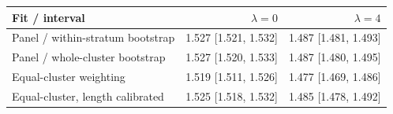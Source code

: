 \begin{tabular}{lrr}
\toprule
Fit / interval & $\lambda=0$ & $\lambda=4$ \\
\midrule
Panel / within-stratum bootstrap & 1.527 [1.521, 1.532] & 1.487 [1.481, 1.493] \\
Panel / whole-cluster bootstrap & 1.527 [1.520, 1.533] & 1.487 [1.480, 1.495] \\
Equal-cluster weighting & 1.519 [1.511, 1.526] & 1.477 [1.469, 1.486] \\
Equal-cluster, length calibrated & 1.525 [1.518, 1.532] & 1.485 [1.478, 1.492] \\
\bottomrule
\end{tabular}
